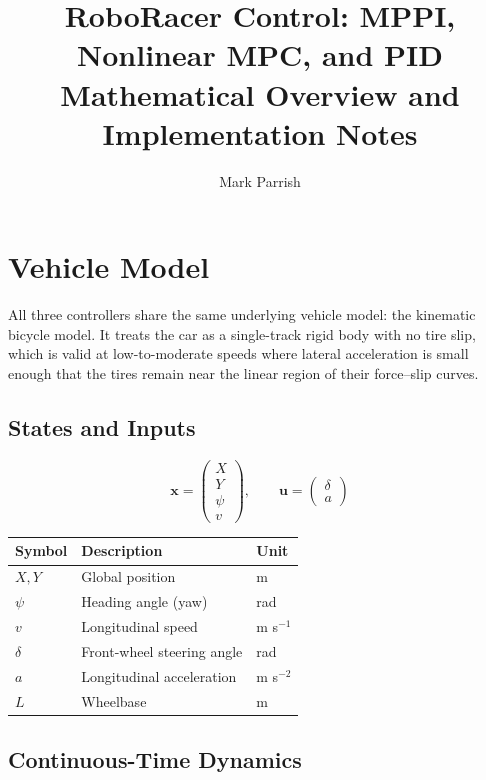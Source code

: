 \documentclass[11pt]{article}
\title{\textbf{RoboRacer Control: MPPI, Nonlinear MPC, and PID}\\[0.4em]
\large Mathematical Overview and Implementation Notes}
\author{Mark Parrish}
\date{}
\begin{document}
\maketitle
\tableofcontents
\newpage

\section{Vehicle Model}

All three controllers share the same underlying vehicle model: the
kinematic bicycle model.  It treats the car as a single-track rigid
body with no tire slip, which is valid at low-to-moderate speeds where lateral
acceleration is small enough that the tires remain near the linear region of
their force--slip curves.

\subsection{States and Inputs}

\[
\bm{x} = \begin{pmatrix} X \\ Y \\ \psi \\ v \end{pmatrix}, \qquad
\bm{u} = \begin{pmatrix} \delta \\ a \end{pmatrix}
\]

\begin{center}
\begin{tabular}{lll}
\toprule
Symbol & Description & Unit \\
\midrule
$X, Y$ & Global position & m \\
$\psi$ & Heading angle (yaw) & rad \\
$v$    & Longitudinal speed & m s$^{-1}$ \\
$\delta$ & Front-wheel steering angle & rad \\
$a$    & Longitudinal acceleration & m s$^{-2}$ \\
$L$    & Wheelbase & m \\
\bottomrule
\end{tabular}
\end{center}

\subsection{Continuous-Time Dynamics}
\end{document}
